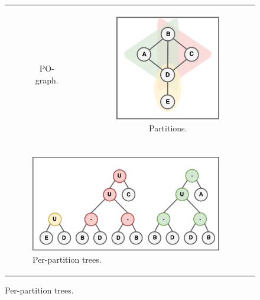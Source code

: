 \begin{figure}[htb]
\begin{tabular}[c]{ccc}
\begin{subfigure}[c]{0.28\linewidth}
			\caption{\ac{PO}-graph.}
			\label{fig:pipe1}
		\end{subfigure}&
		\begin{subfigure}[c]{0.28\linewidth}
			\includegraphics[width=\textwidth]{figures/pipe_2.pdf}
			\caption{Partitions.}
			\label{fig:pipe2}
		\end{subfigure}\\
		\\
		\multicolumn{2}{l}{
			\begin{subfigure}[l]{0.56\linewidth}
				\includegraphics[width=\textwidth]{figures/pipe_4.pdf}
				\caption{Per-partition trees.}
				\label{fig:pipe3}
			\end{subfigure}
}
\end{tabular}
\end{figure}
